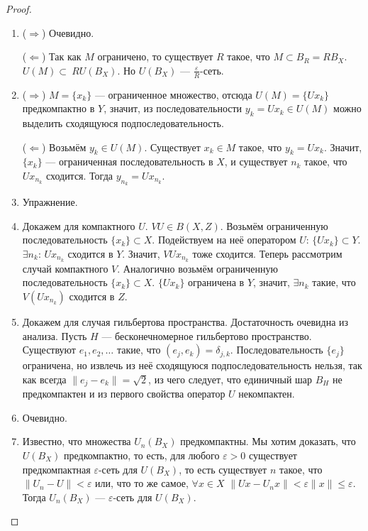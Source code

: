 \documentclass[11pt,openany,a4paper]{scrartcl}
\theoremstyle{plain}
\theoremstyle{definition}
\begin{document}
\begin{proof}
\mbox{}
    \begin{enumerate}
        \item ($\Rightarrow$) Очевидно.
        
        ($\Leftarrow$) Так как $M$ ограничено, то существует $R$ такое, что
        $M \subset B_R = RB_X$. $U(M) \subset~RU(B_X)$.
        Но $U(B_X)$ — $\frac{\varepsilon}{R}$-сеть.
        
        \item ($\Rightarrow$) $M = \{x_k\}$ — ограниченное множество, отсюда
        $U(M) = \{Ux_k\}$ предкомпактно в $Y$, значит, из последовательности
        $y_k = Ux_k \in U(M)$ можно выделить сходящуюся подпоследовательность.
        
        ($\Leftarrow$) Возьмём $y_k \in U(M)$. Существует $x_k \in M$ такое, что
        $y_k = Ux_k$. Значит, $\{x_k\}$ — ограниченная последовательность в $X$, и
        существует $n_k$ такое, что $Ux_{n_k}$ сходится. Тогда $y_{n_k} = Ux_{n_k}$.
        
        \item Упражнение.
        \item Докажем для компактного $U$. $VU \in B(X, Z)$. Возьмём ограниченную 
        последовательность $\{x_k\} \subset X$.
        Подействуем на неё оператором $U$: $\{Ux_k\}\subset Y$. $\exists n_k$: $Ux_{n_k}$
        сходится в $Y$. Значит, $VUx_{n_k}$ тоже сходится.
        Теперь рассмотрим случай компактного $V$. Аналогично возьмём ограниченную 
        последовательность $\{x_k\} \subset X$. $\{Ux_k\}$ ограничена в $Y$, значит,
        $\exists n_k$ такие, что $V(Ux_{n_k})$ сходится в $Z$.
        
        \item Докажем для случая гильбертова пространства. Достаточность очевидна из анализа.
        Пусть $H$ — бесконечномерное гильбертово пространство. Существуют $e_1, e_2, \ldots$
        такие, что $(e_j, e_k) = \delta_{j,k}$. Последовательность $\{e_j\}$ ограничена, но
        извлечь из неё сходящуюся подпоследовательность нельзя, так как всегда
        $\|e_j - e_k\| = \sqrt 2$, из чего следует, что единичный шар $B_H$ не предкомпактен 
        и из первого свойства оператор $U$ некомпактен.
        
        \item Очевидно.
        
        \item Известно, что множества $U_n(B_X)$ предкомпактны. Мы хотим доказать, что
        $U(B_X)$ предкомпактно, то есть, для любого $\varepsilon > 0$ существует
        предкомпактная $\varepsilon$-сеть для $U(B_X)$, то есть существует $n$ такое, что
        $\|U_n - U\| < \varepsilon$ или, что то же самое,
        $\forall x \in X$ $\|Ux - U_nx\| < \varepsilon\|x\| \leqslant \varepsilon$.
        Тогда $U_n(B_X)$ — $\varepsilon$-сеть для $U(B_X)$.
        

\end{enumerate}
\end{proof}
\end{document}
